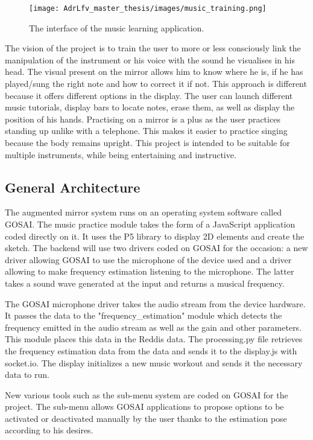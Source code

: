 \begin{figure}[h]
    \centering
    \texttt{[image: AdrLfv\_master\_thesis/images/music\_training.png]}
    \caption{The interface of the music learning application.}
    \label{fig:music_training}
\end{figure}

The vision of the project is to train the user to more or less consciously link the manipulation of the instrument or his voice with the sound he visualises in his head. The visual present on the mirror allows him to know where he is, if he has played/sung the right note and how to correct it if not.
This approach is different because it offers different options in the display. The user can launch different music tutorials, display bars to locate notes, erase them, as well as display the position of his hands.
Practising on a mirror is a plus as the user practices standing up unlike with a telephone. This makes it easier to practice singing because the body remains upright. This project is intended to be suitable for multiple instruments, while being entertaining and instructive.

\subsection{General Architecture}

The augmented mirror system runs on an operating system software called GOSAI. The music practice module takes the form of a JavaScript application coded directly on it. It uses the P5 library to display 2D elements and create the sketch. The backend will use two drivers coded on GOSAI for the occasion: a new driver allowing GOSAI to use the microphone of the device used and a driver allowing to make frequency estimation listening to the microphone. The latter takes a sound wave generated at the input and returns a musical frequency.

The GOSAI microphone driver takes the audio stream from the device hardware. It passes the data to the "frequency\_estimation" module which detects the frequency emitted in the audio stream as well as the gain and other parameters. This module places this data in the Reddis data. The processing.py file retrieves the frequency estimation data from the data and sends it to the display.js with socket.io. The display initializes a new music workout and sends it the necessary data to run.

New various tools such as the sub-menu system are coded on GOSAI for the project. The sub-menu allows GOSAI applications to propose options to be activated or deactivated manually by the user thanks to the estimation pose according to his desires.

